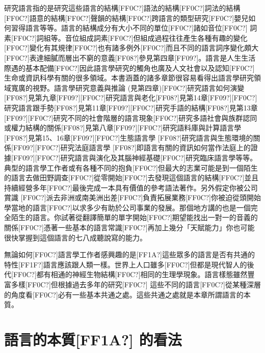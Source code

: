 研究語言指的是研究這些語言的結構[FF0C?]語法的結構[FF0C?]詞法的結構[FF0C?]語意的結構[FF0C?]聲韻的結構[FF0C?]跨語言的類型研究[FF0C?]嬰兒如何習得語言等等。語言的結構成分有大小不同的單位[FF0C?]諸如音位[FF0C?] 詞素[FF0C?]詞組等。音位組成詞素[FF0C?]但組成過程往往產生各種有趣的變化[FF0C?]變化有其規律[FF0C?]也有諸多例外[FF0C?]而且不同的語言詞序變化頗大[FF0C?]表達細膩而層出不窮的意義[FF08?]參見第四章[FF09?]。語言是人生生活際遇的基本配備[FF0C?]因此語言學研究的觸角也廣及人文社會以及認知[FF0C?]生命或資訊科學有關的很多領域。本書涵蓋的諸多章節很容易看得出語言學研究領域寬廣的視野。語言學研究意義與推論 (見第四章)[FF0C?]研究語言如何演變[FF08?]見第九章[FF09?][FF0C?]研究語言與老化[FF08?]見第14章[FF09?][FF0C?]研究語言跟手勢[FF08?]見第11章[FF09?][FF0C?]研究手語的結構[FF08?]見第13章[FF09?][FF0C?]研究不同的社會階層的語言現象[FF0C?]研究多語社會與族群認同或權力結構的關係[FF08?]見第八章[FF09?][FF0C?]研究語料庫與計算語言學[FF08?]見第15、16章[FF09?][FF0C?]生態語言學 [FF08?]研究語言與生態環境的關係[FF09?][FF0C?]研究法庭語言學 [FF08?]即語言有關的資訊如何當作法庭上的證據[FF09?][FF0C?]研究語言與演化及其腦神經基礎[FF0C?]研究臨床語言學等等。典型的語言學工作者或有各種不同的抱負[FF0C?]但最大的志業可能是到一個陌生的語言去做田野調查[FF0C?]從零開始[FF0C?]去發現這個語言的結構[FF0C?]並且持續經營多年[FF0C?]最後完成一本具有價值的參考語法著作。另外假定你被公司賞識 [FF0C?]派去非洲或南美洲出差[FF0C?]負責拓展業務[FF0C?]你被迫從頭開始學當地的語言[FF0C?]以求多少有助於公司事業的發展。那個地方講的也是一個完全陌生的語言。你試著從翻譯簡單的單字開始[FF0C?]期望能找出一對一的音義的關係[FF0C?]憑著一些基本的語言常識[FF0C?]再加上幾分「天賦能力」你也可能很快掌握到這個語言的七八成聽說寫的能力。

無論如何[FF0C?]語言學工作者感興趣的是[FF1A?]這些眾多的語言是否有共通的特性[FF1F?]語言應該跟人類一樣。世界上人口雖多[FF0C?]但都是現代智人的後代[FF0C?]都有相通的神經生物結構[FF0C?]相同的生理學現象。語言樣態雖然豐富多樣[FF0C?]但根據過去多年的研究[FF0C?] 這些不同的語言[FF0C?]從某種深層的角度看[FF0C?]必有一些基本共通之處。這些共通之處就是本章所謂語言的本質。

\section{語言的本質[FF1A?]\citet{Hockett1960} 的看法}  %

